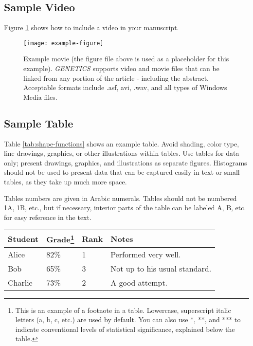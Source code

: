 \documentclass[9pt,twocolumn,twoside]{gsajnl}
\begin{document}
\subsection{Sample Video}

Figure \ref{video:spectrum} shows how to include a video in your manuscript.

\begin{figure}[htbp]
\centering
\texttt{[image: example-figure]}
\caption{Example movie (the figure file above is used as a placeholder for this example). \textit{GENETICS} supports video and movie files that can be linked from any portion of the article - including the abstract. Acceptable formats include .asf, avi, .wav, and all types of Windows Media files.   
}%
\label{video:spectrum}
\end{figure}


\subsection{Sample Table}

Table \ref{tab:shape-functions} shows an example table. Avoid shading, color type, line drawings, graphics, or other illustrations within tables. Use tables for data only; present drawings, graphics, and illustrations as separate figures. Histograms should not be used to present data that can be captured easily in text or small tables, as they take up much more space.  

Tables numbers are given in Arabic numerals. Tables should not be numbered 1A, 1B, etc., but if necessary, interior parts of the table can be labeled A, B, etc. for easy reference in the text.  


\begin{table*}[htbp]
\centering
\caption{\bf Students and their grades}
\begin{tableminipage}{\textwidth}
\begin{tabularx}{\textwidth}{XXXX}
\hline
Student & Grade\footnote{This is an example of a footnote in a table. Lowercase, superscript italic letters (a, b, c, etc.) are used by default. You can also use *, **, and *** to indicate conventional levels of statistical significance, explained below the table.} & Rank & Notes \\
\hline
Alice & 82\% & 1 & Performed very well.\\
Bob & 65\% & 3 & Not up to his usual standard.\\
Charlie & 73\% & 2 & A good attempt.\\
\hline
\end{tabularx}
  \label{tab:shape-functions}
\end{tableminipage}
\end{table*}
\end{document}
